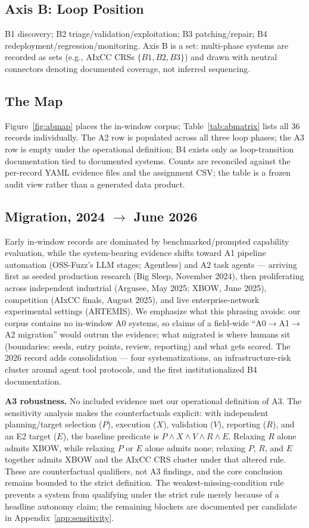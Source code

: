 \documentclass[conference,compsoc]{IEEEtran}
\begin{document}
\subsection{Axis B: Loop Position}
B1 discovery; B2 triage/validation/exploitation; B3 patching/repair; B4
redeployment/regression/monitoring. Axis B is a set: multi-phase systems are recorded as sets
(e.g., AIxCC CRSs $\{B1,B2,B3\}$) and drawn with neutral connectors denoting documented
coverage, not inferred sequencing.

\subsection{The Map}
Figure~\ref{fig:abmap} places the in-window corpus; Table~\ref{tab:abmatrix} lists all 36
records individually. The A2 row is populated across all three loop phases; the A3 row is
empty under the operational definition; B4 exists only as loop-transition documentation tied to
 documented systems. Counts are reconciled against the per-record YAML evidence files and the
 assignment CSV; the table is a frozen audit view rather than a generated data product.



\subsection{Migration, 2024 $\rightarrow$ June 2026}
Early in-window records are dominated by benchmarked/prompted capability evaluation, while the
system-bearing evidence shifts toward A1 pipeline automation (OSS-Fuzz's LLM stages; Agentless)
and A2 task agents --- arriving first as seeded production research (Big Sleep, November 2024),
then proliferating across independent industrial (Argusee, May 2025; XBOW, June 2025),
competition (AIxCC finals, August 2025), and live enterprise-network experimental settings (ARTEMIS).
We emphasize what this phrasing avoids: our corpus contains no in-window A0 systems, so claims
of a field-wide ``A0$\rightarrow$A1$\rightarrow$A2 migration'' would outrun the evidence; what
migrated is where humans sit (boundaries: seeds, entry points, review, reporting) and what gets
scored. The 2026 record adds consolidation --- four systematizations, an infrastructure-risk
cluster around agent tool protocols, and the first institutionalized B4 documentation.

\textbf{A3 robustness.} No included evidence met our operational definition of A3. The sensitivity analysis makes the counterfactuals explicit: with independent
planning/target selection ($P$), execution ($X$), validation ($V$), reporting ($R$), and an E2
target ($E$), the baseline predicate is $P\land X\land V\land R\land E$. Relaxing $R$ alone
admits XBOW, while relaxing $P$ or $E$ alone admits none; relaxing $P$, $R$, and $E$ together
admits XBOW and the AIxCC CRS cluster under that altered rule. These are counterfactual
qualifiers, not A3 findings, and the core conclusion remains bounded to the strict definition.
The weakest-missing-condition rule prevents a system from qualifying under the strict rule merely
because of a headline autonomy claim; the remaining blockers are documented per candidate in
Appendix~\ref{app:sensitivity}.
\end{document}

